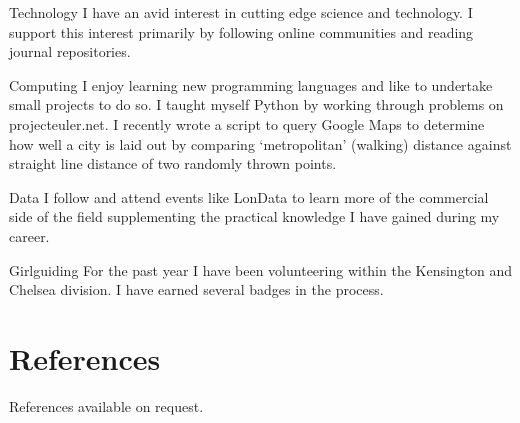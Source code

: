\documentclass[a4paper]{article}
\begin{document}
\begin{CV}
	
\item[Technology] I have an avid interest in cutting edge science and technology. I support this interest primarily by following online communities and reading journal repositories.

\item[Computing] I enjoy learning new programming languages and like to undertake small projects to do so. I taught myself Python by working through problems on projecteuler.net. I recently wrote a script to query Google Maps to determine how well a city is laid out by comparing `metropolitan' (walking) distance against straight line distance of two randomly thrown points.

\item[Data] I follow and attend events like LonData to learn more of the commercial side of the field supplementing the practical knowledge I have gained during my career.

\item[Girlguiding] For the past year I have been volunteering within the Kensington and Chelsea division. I have earned several badges in the process.

\end{CV}



\section{References}

\noindent References available on request.

%
%
%
\end{document}
